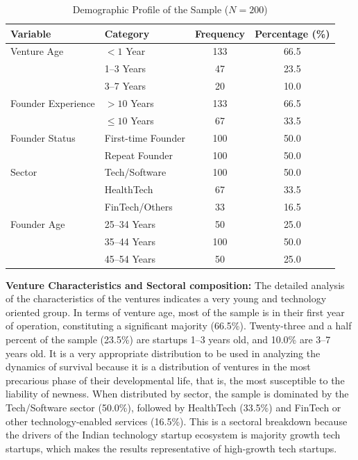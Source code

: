 \documentclass{ieeeaccess}
\begin{document}
\begin{table}[htbp]
\caption{Demographic Profile of the Sample ($N = 200$)}
\label{tab:demographic_profile}
\centering
\begin{tabular}{llcc}
\hline
\textbf{Variable} & \textbf{Category} & \textbf{Frequency} & \textbf{Percentage (\%)} \\
\hline

Venture Age & $<1$ Year & 133 & 66.5 \\
            & 1--3 Years & 47 & 23.5 \\
            & 3--7 Years & 20 & 10.0 \\
\hline

Founder Experience & $>10$ Years & 133 & 66.5 \\
                    & $\leq 10$ Years & 67 & 33.5 \\
\hline

Founder Status & First-time Founder & 100 & 50.0 \\
               & Repeat Founder & 100 & 50.0 \\
\hline

Sector & Tech/Software & 100 & 50.0 \\
       & HealthTech & 67 & 33.5 \\
       & FinTech/Others & 33 & 16.5 \\
\hline

Founder Age & 25--34 Years & 50 & 25.0 \\
            & 35--44 Years & 100 & 50.0 \\
            & 45--54 Years & 50 & 25.0 \\
\hline

\end{tabular}
\end{table}

\textbf{Venture Characteristics and Sectoral composition:}
The detailed analysis of the characteristics of the ventures indicates a very young and technology oriented group. In terms of venture age, most of the sample is in their first year of operation, constituting a significant majority (66.5\%). Twenty-three and a half percent of the sample (23.5\%) are startups 1--3 years old, and 10.0\% are 3--7 years old. It is a very appropriate distribution to be used in analyzing the dynamics of survival because it is a distribution of ventures in the most precarious phase of their developmental life, that is, the most susceptible to the liability of newness. When distributed by sector, the sample is dominated by the Tech/Software sector (50.0\%), followed by HealthTech (33.5\%) and FinTech or other technology-enabled services (16.5\%). This is a sectoral breakdown because the drivers of the Indian technology startup ecosystem is majority growth tech startups, which makes the results representative of high-growth tech startups.
\end{document}

